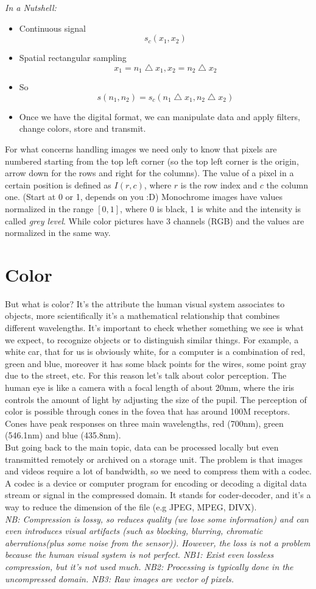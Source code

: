 \textit{In a Nutshell:}
\begin{itemize}
    \item Continuous signal \[ s_c(x_1, x_2)\]
    \item Spatial rectangular sampling \[ x_1 = n_1 \bigtriangleup x_1, x_2 = n_2 \bigtriangleup x_2\]
    \item So \[ s(n_1, n_2) = s_c(n_1 \bigtriangleup x_1, n_2 \bigtriangleup x_2)\]
    \item Once we have the digital format, we can manipulate data and apply filters, change colors, store and transmit.
\end{itemize}

For what concerns handling images we need only to know that pixels are numbered starting from the top left corner (so the top left corner is the origin, arrow down for the rows and right for the columns).
The value of a pixel in a certain position is defined as \(I(r,c)\), where \(r\) is the row index and \(c\) the column one. (Start at 0 or 1, depends on you :D)
Monochrome images have values normalized in the range \([0,1]\), where 0 is black, 1 is white and the intensity is called \textit{grey level}. While color pictures have 3 channels (RGB) and the values are normalized in the same way.
\section{Color}
But what is color? It's the attribute the human visual system associates to objects, more scientifically it's a mathematical relationship that combines different wavelengths. 
It's important to check whether something we see is what we expect, to recognize objects or to distinguish similar things. For example, a white car, that for us is obviously white, for a computer is a combination of red, green and blue, moreover it has some black points for the wires, some point gray due to the street, etc.
For this reason let's talk about color perception. The human eye is like a camera with a focal length of about 20mm, where the iris controls the amount of light by adjusting the size of the pupil. 
The perception of color is possible through cones in the fovea that has around 100M receptors.  Cones have peak responses on three main wavelengths, red (700nm), green (546.1nm) and blue (435.8nm).
\\
But going back to the main topic, data can be processed locally but even transmitted remotely or archived on a storage unit. The problem is that images and videos require a lot of bandwidth, so we need to compress them with a codec.
A codec is a device or computer program for encoding or decoding a digital data stream or signal in the compressed domain. It stands for coder-decoder, and it's a way to reduce the dimension of the file (e.g JPEG, MPEG, DIVX). 
\\\textit{NB: Compression is lossy, so reduces quality (we lose some information) and can even introduces visual artifacts (such as blocking, blurring, chromatic aberrations(plus some noise from the sensor)). However, the loss is not a problem because the human visual system is not perfect.
NB1: Exist even lossless compression, but it's not used much.
NB2: Processing is typically done in the uncompressed domain. 
NB3: Raw images are vector of pixels.
}
